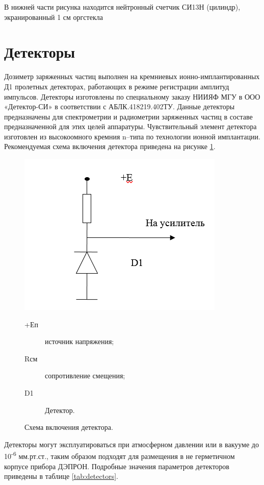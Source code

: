 В нижней части рисунка находится нейтронный счетчик СИ13Н (цилиндр), экранированный 1 см оргстекла

\section{Детекторы}

Дозиметр заряженных частиц выполнен на кремниевых ионно-имплантированных Д1 пролетных детекторах, работающих в режиме регистрации амплитуд импульсов. Детекторы изготовлены по специальному заказу НИИЯФ МГУ в ООО «Детектор-СИ» в соответствии с АБЛК.418219.402ТУ. Данные детекторы предназначены для спектрометрии и радиометрии заряженных частиц в составе предназначенной для этих целей аппаратуры. Чувствительный элемент детектора изготовлен из высокоомного кремния n--типа по технологии ионной имплантации. Рекомендуемая схема включения детектора приведена на рисунке \ref{fig:detector_sch}. 


\begin{figure}[h]
	\centering
	\includegraphics[width=0.5\linewidth]{images/detector_sch}
	\caption{Схема включения детектора.}
	\medskip
	\small
	\begin{description}
		\item[+Еп] источник напряжения;
		\item[Rсм] сопротивление смещения;
		\item[D1] Детектор.
	\end{description}			
	\label{fig:detector_sch}
\end{figure}
	


Детекторы могут эксплуатироваться при атмосферном давлении или в вакууме до 10\textsuperscript{-6} мм.рт.ст., таким образом подходят для размещения  в не герметичном корпусе прибора ДЭПРОН. Подробные значения параметров детекторов приведены в таблице \ref{tab:detectors}.

